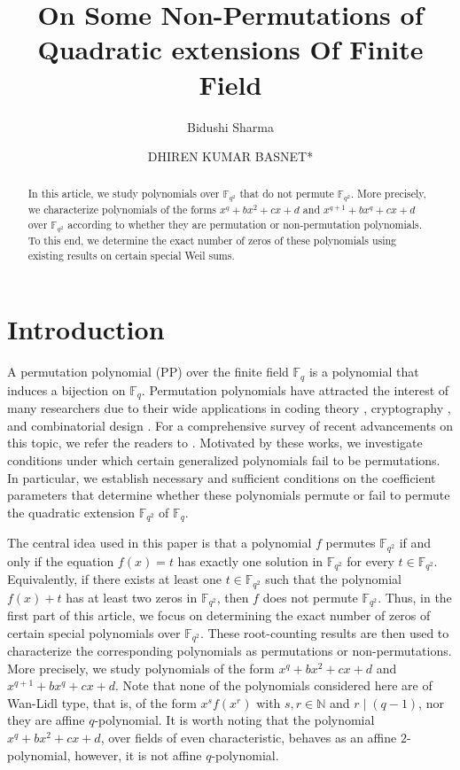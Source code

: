 \documentclass[12pt]{amsart}
\title{ On Some Non-Permutations of Quadratic extensions Of Finite Field}
\author{Bidushi Sharma}
\author{DHIREN KUMAR BASNET*}
\theoremstyle{definition}
\theoremstyle{remark}
\numberwithin{equation}{section}
\begin{document}
	\begin{abstract}
		

    In this article, we study polynomials over $\mathbb{F}_{q^2}$ that do not permute $\mathbb{F}_{q^2}$. More precisely, we characterize polynomials of the forms $x^q + b x^2 + c x + d$ and $x^{q+1} + b x^q + c x + d$ over $\mathbb{F}_{q^2}$ according to whether they are permutation or non-permutation polynomials. To this end, we determine the exact number of zeros of these polynomials using existing results on certain special Weil sums.
    \end{abstract}

	
	\maketitle
	
	\section{Introduction}
    A permutation polynomial (PP) over the finite field $\mathbb{F}_{q}$ is a polynomial that induces a bijection on $\mathbb{F}_{q}$. Permutation polynomials have attracted the interest of many researchers due to their wide applications in coding theory \cite{c2,c1}, cryptography \cite{cr1,cr2}, and combinatorial design \cite{cd}. For a comprehensive survey of recent advancements on this topic, we refer the readers to \cite{r5,p1,p2,p3}. Motivated by these works, we investigate conditions under which certain generalized polynomials fail to be permutations. In particular, we establish necessary and sufficient conditions on the coefficient parameters that determine whether these polynomials permute or fail to permute the quadratic extension $\mathbb{F}_{q^2}$ of $\mathbb{F}_{q}$.

The central idea used in this paper is that a polynomial $f$ permutes $\mathbb{F}_{q^2}$ if and only if the equation $f(x)=t$ has exactly one solution in $\mathbb{F}_{q^2}$ for every $t \in \mathbb{F}_{q^2}$. Equivalently, if there exists at least one $t \in \mathbb{F}_{q^2}$ such that the polynomial $f(x)+t$ has at least two zeros in $\mathbb{F}_{q^2}$, then $f$ does not permute $\mathbb{F}_{q^2}$. Thus, in the first part of this article, we focus on determining the exact number of zeros of certain special polynomials over $\mathbb{F}_{q^2}$. These root-counting results are then used to characterize the corresponding polynomials as permutations or non-permutations. More precisely, we study polynomials of the form $x^q + b x^2 + c x + d$ and $x^{q+1} + b x^q + c x + d$. Note that none of the polynomials considered here are of Wan-Lidl type, that is, of the form $x^s f(x^r)$ with $s,r \in \mathbb{N}$ and $r \mid (q-1)$, nor they are affine $q$-polynomial. It is worth noting that the polynomial $x^q + b x^2 + c x+d$, over fields of even characteristic, behaves as an affine $2$-polynomial, however, it is not affine $q$-polynomial.
    
\end{document}
